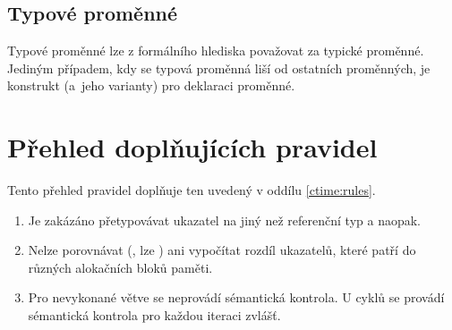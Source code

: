\subsection{Typové proměnné}
Typové proměnné lze z formálního hlediska považovat za typické \ctime proměnné. Jediným případem, kdy se typová proměnná liší od ostatních \ctime proměnných, je konstrukt  (a~jeho varianty) pro deklaraci proměnné.


\section{Přehled doplňujících pravidel} \label{ctime:moreRules}
Tento přehled pravidel doplňuje ten uvedený v oddílu \ref{ctime:rules}.

\begin{enumerate}
	\item Je zakázáno přetypovávat \ctime ukazatel na jiný než referenční \ctime typ a naopak.
	\item Nelze porovnávat (\inlineCode{< > <= >=}, lze ) ani vypočítat rozdíl \ctime ukazatelů, které patří do různých alokačních bloků paměti.
	\item Pro nevykonané \ctime větve se neprovádí sémantická kontrola. U \ctime cyklů se provádí sémantická kontrola pro každou iteraci zvlášť.
\end{enumerate}
